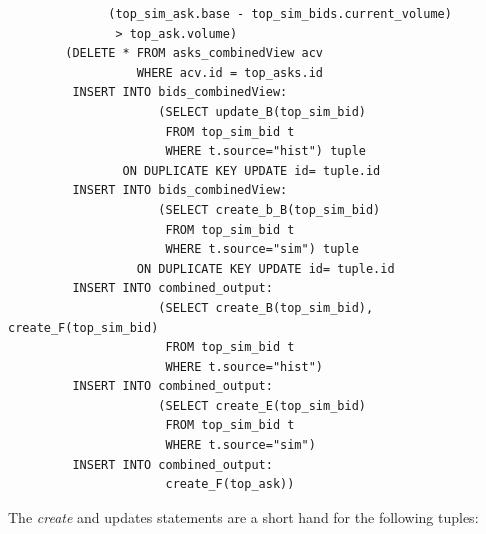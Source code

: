 \documentclass{article}
\begin{document}
\begin{verbatim}
              (top_sim_ask.base - top_sim_bids.current_volume)
               > top_ask.volume)              
        (DELETE * FROM asks_combinedView acv
                  WHERE acv.id = top_asks.id
         INSERT INTO bids_combinedView: 
                     (SELECT update_B(top_sim_bid)
                      FROM top_sim_bid t
                      WHERE t.source="hist") tuple
                ON DUPLICATE KEY UPDATE id= tuple.id
         INSERT INTO bids_combinedView: 
                     (SELECT create_b_B(top_sim_bid)
                      FROM top_sim_bid t
                      WHERE t.source="sim") tuple
                  ON DUPLICATE KEY UPDATE id= tuple.id
         INSERT INTO combined_output:
                     (SELECT create_B(top_sim_bid), create_F(top_sim_bid)
                      FROM top_sim_bid t
                      WHERE t.source="hist")
         INSERT INTO combined_output:
                     (SELECT create_E(top_sim_bid)
                      FROM top_sim_bid t
                      WHERE t.source="sim")
         INSERT INTO combined_output:
                      create_F(top_ask))      
\end{verbatim}

The \emph{create} and {updates} statements are a short hand for the following tuples:
\end{document}
